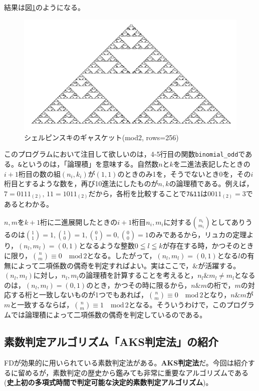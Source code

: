 結果は図\ref{sierp_2_and}のようになる。
\begin{figure}[ht]
    \centering
        \includegraphics[scale=0.5]{../figures/Figure_using_and.png}
    \caption{シェルピンスキのギャスケット(mod2, rows=256)}
    \label{sierp_2_and}
\end{figure}

このプログラムにおいて注目して欲しいのは，4-5行目の関数\texttt{binomial\_odd}である。\texttt{\&}というのは，「論理積」を意味する。自然数$n$と$k$を二進法表記したときの$i+1$桁目の数の組$(n_i,k_i)$が$(1,1)$のときのみ1を，そうでないとき0を，その$i$桁目とするような数を，再び10進法にしたものが$n,k$の論理積である。例えば，$7=0111{}_{(2)},\,11=1011{}_{(2)}$だから，各桁を比較することで\texttt{7\&11}は$0011{}_{(2)}=3$であるとわかる。

$n,m$を$k+1$桁に二進展開したときの$i+1$桁目$n_i,m_i$に対する$\binom{n_i}{m_i}$としてありうるのは$\binom{1}{1}=1,\binom{1}{0}=1,\binom{0}{1}=0,\binom{0}{0}=1$のみであるから，リュカの定理より，$(n_l,m_l)=(0,1)$となるような整数$0\leqq l \leqq k$が存在する時，かつそのときに限り，$\binom{n}{m}\equiv 0 \quad \mathrm{mod}\,2$となる。したがって，$(n_l,m_l)=(0,1)$となる$l$の有無によって二項係数の偶奇を判定すればよい。実はここで，$\mathtt{\&}$が活躍する。$(n_l,m_l)$に対し，$n_l,m_l$の論理積を計算することを考えると，$n_l\mathtt{\&}m_l\ne m_l$となるのは，$(n_l,m_l)=(0,1)$のとき，かつその時に限るから，$n\mathtt{\&}m$の桁で，$m$の対応する桁と一致しないものが1つでもあれば，$\binom{n}{m}\equiv 0\quad \mathrm{mod}\,2$となり，$n\mathtt{\&}m$が$m$と一致するならば，$\binom{n}{m}\equiv 1\quad\mathrm{mod}\,2$となる。そういうわけで，このプログラムでは論理積によって二項係数の偶奇を判定しているのである。

\subsection{素数判定アルゴリズム「AKS判定法」の紹介}
\textsf{FD}が効果的に用いられている素数判定法がある。\textbf{AKS判定法}だ。今回は紹介するに留めるが，素数判定の歴史から鑑みても非常に重要なアルゴリズムである(\textbf{史上初の多項式時間で判定可能な決定的素数判定アルゴリズム})。

